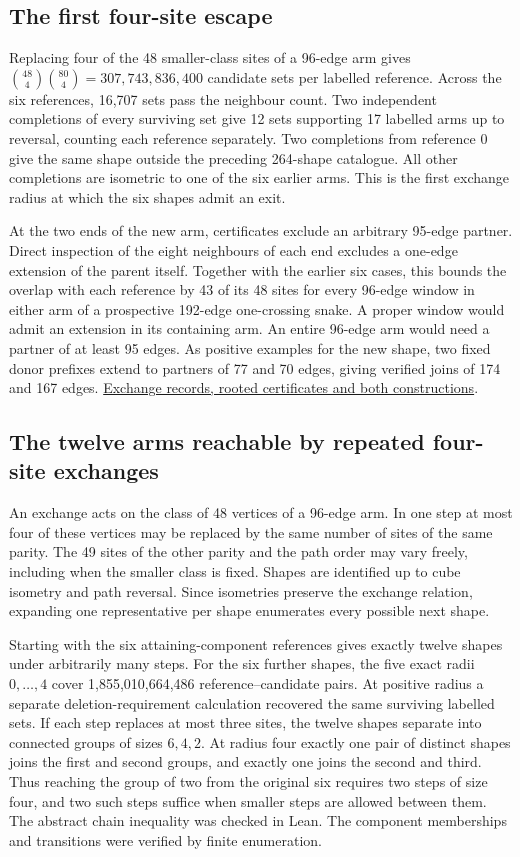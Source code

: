 \documentclass[11pt,a4paper]{article}
\theoremstyle{definition}
\theoremstyle{remark}
\begin{document}
\subsection{The first four-site escape}
\label{sec:four-site-escape}
Replacing four of the 48 smaller-class sites of a 96-edge arm gives
\(\binom{48}{4}\binom{80}{4}=307{,}743{,}836{,}400\) candidate sets
per labelled reference. Across the six references, 16,707 sets pass
the neighbour count. Two independent completions of every surviving
set give 12 sets supporting 17 labelled arms up to reversal, counting
each reference separately. Two completions from reference 0 give the
same shape outside the preceding 264-shape catalogue. All other
completions are isometric to one of the six earlier arms. This is the
first exchange radius at which the six shapes admit an exit.

At the two ends of the new arm, certificates exclude an arbitrary
95-edge partner. Direct inspection of the eight neighbours of each end
excludes a one-edge extension of the parent itself. Together with the
earlier six cases, this bounds the overlap with each reference by 43 of
its 48 sites for every 96-edge window in either arm of a prospective
192-edge one-crossing snake. A proper window would admit an extension
in its containing arm. An entire 96-edge arm would need a partner of
at least 95 edges. As positive examples for the new shape, two fixed
donor prefixes extend to partners of 77 and 70 edges, giving verified
joins of 174 and 167 edges.
\href{https://github.com/hironaka-iori/Snake-in-the-box-in-9/tree/main/milestones/258-four-exchange-parents}{Exchange records, rooted certificates and both constructions}.

\subsection{The twelve arms reachable by repeated four-site exchanges}
An exchange acts on the class of 48 vertices of a 96-edge arm.
In one step at most four of these vertices may be replaced by the
same number of sites of the same parity. The 49 sites of the other
parity and the path order may vary freely, including when the
smaller class is fixed. Shapes are identified up to cube isometry and
path reversal. Since isometries preserve the exchange relation,
expanding one representative per shape enumerates every possible
next shape.

Starting with the six attaining-component references gives exactly
twelve shapes under arbitrarily many steps. For the six further shapes,
the five exact radii \(0,\ldots,4\) cover 1,855,010,664,486
reference--candidate pairs. At positive radius a separate
deletion-requirement calculation recovered the same surviving labelled
sets. If each step replaces at most three sites, the twelve shapes
separate into connected groups of sizes \(6,4,2\). At radius four
exactly one pair of distinct shapes joins the first and second groups,
and exactly one joins the second and third. Thus reaching the group of
two from the original six requires two steps of size four, and two
such steps suffice when smaller steps are allowed between them.
The abstract chain inequality was checked in Lean. The component
memberships and transitions were verified by finite enumeration.
\end{document}
